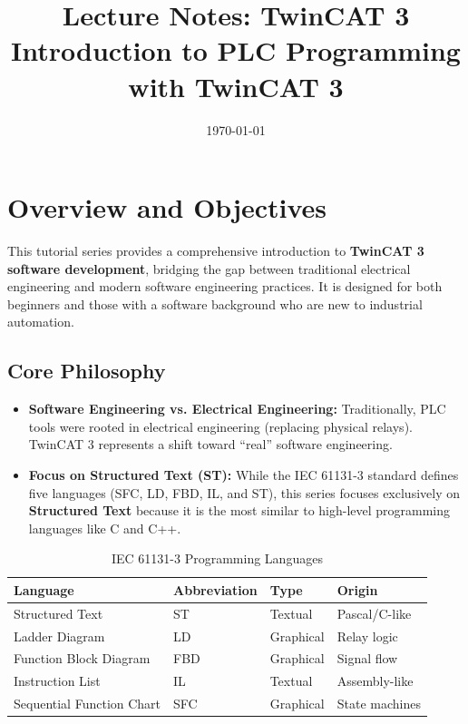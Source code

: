 \documentclass[11pt,a4paper]{article}
\title{
    \vspace{-1cm}
    \textbf{Lecture Notes: TwinCAT 3}\\
    \Large Introduction to PLC Programming with TwinCAT 3
}
\author{}
\date{\today}
\begin{document}
\maketitle

\tableofcontents
\newpage

\section{Overview and Objectives}

This tutorial series provides a comprehensive introduction to \textbf{TwinCAT 3 software development}, bridging the gap between traditional electrical engineering and modern software engineering practices. It is designed for both beginners and those with a software background who are new to industrial automation.

\subsection{Core Philosophy}

\begin{itemize}[leftmargin=*]
    \item \textbf{Software Engineering vs. Electrical Engineering:} Traditionally, PLC tools were rooted in electrical engineering (replacing physical relays). TwinCAT 3 represents a shift toward ``real'' software engineering.
    
    \item \textbf{Focus on Structured Text (ST):} While the IEC 61131-3 standard defines five languages (SFC, LD, FBD, IL, and ST), this series focuses exclusively on \textbf{Structured Text} because it is the most similar to high-level programming languages like C and C++.
\end{itemize}

\begin{table}[h]
\centering
\begin{tabular}{@{}llll@{}}
\toprule
\textbf{Language} & \textbf{Abbreviation} & \textbf{Type} & \textbf{Origin} \\
\midrule
Structured Text & ST & Textual & Pascal/C-like \\
Ladder Diagram & LD & Graphical & Relay logic \\
Function Block Diagram & FBD & Graphical & Signal flow \\
Instruction List & IL & Textual & Assembly-like \\
Sequential Function Chart & SFC & Graphical & State machines \\
\bottomrule
\end{tabular}
\caption{IEC 61131-3 Programming Languages}
\end{table}
\end{document}
